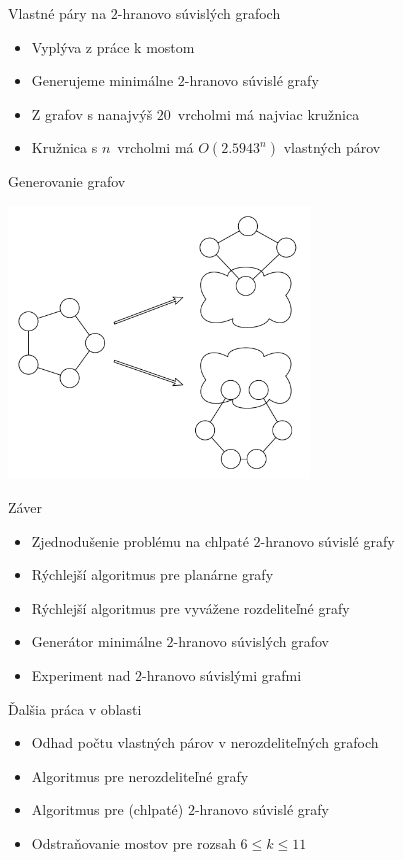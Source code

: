 \documentclass[slovak]{beamer}
\begin{document}
\begin{frame}{Vlastné páry na $2$-hranovo súvislých grafoch}
    \begin{itemize}
        \item Vyplýva z práce k mostom
        \item Generujeme minimálne $2$-hranovo súvislé grafy
        \item Z grafov s nanajvýš $20$ vrcholmi má najviac kružnica
        \item Kružnica s $n$ vrcholmi má $O(2.5943^n)$ vlastných párov
    \end{itemize}
\end{frame}

\begin{frame}{Generovanie grafov}
    \begin{center}
        \includegraphics[width=0.6\textwidth]{grafy/gengraph.pdf}
    \end{center}
\end{frame}

\begin{frame}{Záver}
    \begin{itemize}
        \item Zjednodušenie problému na chlpaté $2$-hranovo súvislé grafy
        \item Rýchlejší algoritmus pre planárne grafy
        \item Rýchlejší algoritmus pre vyvážene rozdeliteľné grafy
        \item Generátor minimálne $2$-hranovo súvislých grafov
        \item Experiment nad $2$-hranovo súvislými grafmi
    \end{itemize}
\end{frame}

\begin{frame}{Ďalšia práca v oblasti}
    \begin{itemize}
        \item Odhad počtu vlastných párov v nerozdeliteľných grafoch
        \item Algoritmus pre nerozdeliteľné grafy
        \item Algoritmus pre (chlpaté) $2$-hranovo súvislé grafy
        \item Odstraňovanie mostov pre rozsah $6 \leq k \leq 11$
    \end{itemize}
\end{frame}
\end{document}
